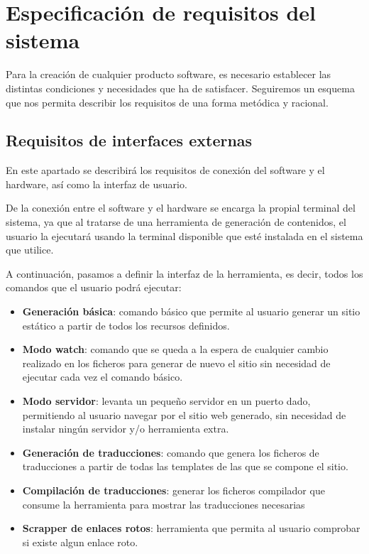 \section{Especificación de requisitos del sistema}

Para la creación de cualquier producto software, es necesario establecer las distintas condiciones y
necesidades que ha de satisfacer. Seguiremos un esquema que nos permita describir los requisitos de una
forma metódica y racional.

\subsection{Requisitos de interfaces externas}

En este apartado se describirá los requisitos de conexión del software y el hardware, así como la interfaz
de usuario.

De la conexión entre el software y el hardware se encarga la propial terminal del sistema, ya que al tratarse de
una herramienta de generación de contenidos, el usuario la ejecutará usando la terminal disponible que esté
instalada en el sistema que utilice.

A continuación, pasamos a definir la interfaz de la herramienta, es decir, todos los comandos que el usuario
podrá ejecutar:

\begin{itemize}
\item \textbf{Generación básica}: comando básico que permite al usuario generar un sitio
estático a partir de todos los recursos definidos.
\item \textbf{Modo watch}: comando que se queda a la espera de cualquier cambio realizado en los 
ficheros para generar de nuevo el sitio sin necesidad de ejecutar cada vez el comando básico.
\item \textbf{Modo servidor}: levanta un pequeño servidor en un puerto dado, permitiendo al usuario
navegar por el sitio web generado, sin necesidad de instalar ningún servidor y/o herramienta extra.
\item \textbf{Generación de traducciones}: comando que genera los ficheros de traducciones a partir de todas las 
templates de las que se compone el sitio.
\item \textbf{Compilación de traducciones}: generar los ficheros compilador que consume la herramienta para mostrar
las traducciones necesarias
\item \textbf{Scrapper de enlaces rotos}: herramienta que permita al usuario comprobar si existe algun enlace roto.
\end{itemize}


